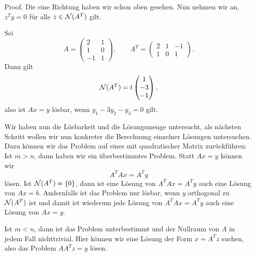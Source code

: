 \begin{emphBox}{}{}
Proof.  Die eine Richtung haben wir schon oben gesehen. Nun nehmen wir an, \(z^T y = 0\) für alle \(z \in {\cal N}(A^T)\) gilt.
\end{emphBox}
\label{vektorraeume/LGS:example-7}
\begin{example}{}{}



Sei
\begin{equation*}
A = \left(  \begin{matrix} 2 & 1 \\ 1  & 0 \\ -1 & 1\end{matrix} \right), \qquad A^T = \left(  \begin{matrix}
2 & 1 & -1 \\ 1 & 0 & 1 \end{matrix} \right).
\end{equation*}
Dann gilt
\begin{equation*}
 {\cal N}(A^T) = t \begin{pmatrix} 1 \\ - 3 \\ -1\end{pmatrix},
\end{equation*}
also ist \(Ax =y\) lösbar, wenn \(y_1 - 3y_2 -y_3 = 0\) gilt.
\end{example}

Wir haben nun die Lösbarkeit und die Lösungsmenge untersucht, als nächsten Schritt wollen wir nun konkreter die Berechnung einzelner Lösungen untersuchen. Dazu können wir das Problem auf eines mit quadratischer Matrix zurückführen: Ist \(m > n\), dann haben wir ein überbestimmtes Problem. Statt \(Ax = y\) können wir
\begin{equation*}
A^TA x = A^T y
\end{equation*}
lösen. Ist \({\cal N}(A^T) =\{0\}\), dann ist eine Lösung von \(A^T A x=A^Ty\) auch eine Lösung von \(Ax =b\). Andernfalls ist das Problem nur lösbar, wenn \(y\) orthogonal zu \({\cal N}(A^T)\) ist und damit ist wiederum jede Lösung von \(A^T A x=A^Ty\) auch eine Lösung von \(Ax =y\).

Ist \(m < n\), dann ist das Problem unterbestimmt und der Nullraum von \(A\) in jedem Fall nichttrivial. Hier können wir eine Lösung der Form \(x=A^T z\) suchen, also das Problem \(AA^T z = y\) lösen.


